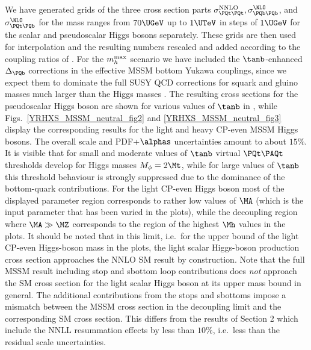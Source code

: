 We have generated grids of the three cross section parts
$\sigma_{\PQt\PQt}^{\mathrm{NNLO}}, \sigma_{\PQb\PQb}^{\NLO}$, and $\sigma_{\PQt\PQb}^{\NLO}$ for the
mass ranges from $70\UGeV$ up to $1\UTeV$ in steps of $1\UGeV$ for the
scalar and pseudoscalar Higgs bosons separately. These grids are then
used for interpolation and the resulting numbers rescaled and added
according to the coupling ratios of \FeynHiggs. For the $m_h^{\rm max}$ scenario we
have included the $\tanb$-enhanced $\Delta_{\PQb}$ corrections in the
effective MSSM bottom Yukawa couplings, since we expect them to dominate
the full SUSY QCD corrections for squark and gluino masses much larger
than the Higgs masses \cite{Degrassi:2010eu}. The resulting cross
sections for the pseudoscalar Higgs boson are shown for various values
of $\tanb$ in , while
Figs.~\ref{YRHXS_MSSM_neutral_fig2} and \ref{YRHXS_MSSM_neutral_fig3}
display the corresponding results for the light and heavy CP-even MSSM
Higgs bosons. The overall scale and PDF+$\alphas$ uncertainties amount to
about $15\%$. It is visible that for small and moderate values of
$\tanb$ virtual $\PQt\PAQt$ thresholds develop for Higgs masses
$M_\phi=2\Mt$, while for large values of $\tanb$ this threshold
behaviour is strongly suppressed due to the dominance of the bottom-quark 
contributions. For the light CP-even Higgs boson most of the
displayed parameter region corresponds to rather low values of $\MA$ 
(which is the input parameter that has been varied in the plots), while
the decoupling region where $\MA \gg \MZ$ corresponds to the region of
the highest $\Mh$ values in the plots. It should be noted that in this
limit, i.e.\ for the upper bound of the light CP-even Higgs-boson mass
in the plots, the light scalar Higgs-boson 
production cross section approaches the NNLO SM result by
construction. Note that the full MSSM result including stop and
sbottom loop contributions does {\it not} approach the SM cross section
for the light scalar Higgs boson at its upper mass bound in general. The
additional contributions from the stops and sbottoms impose a mismatch
between the MSSM cross section in the decoupling limit and the
corresponding SM cross section. This differs from the results of
Section 2 which include the NNLL resummation effects by less than $10\%$,
i.e.~less than the residual scale uncertainties.
\vspace{1cm}

